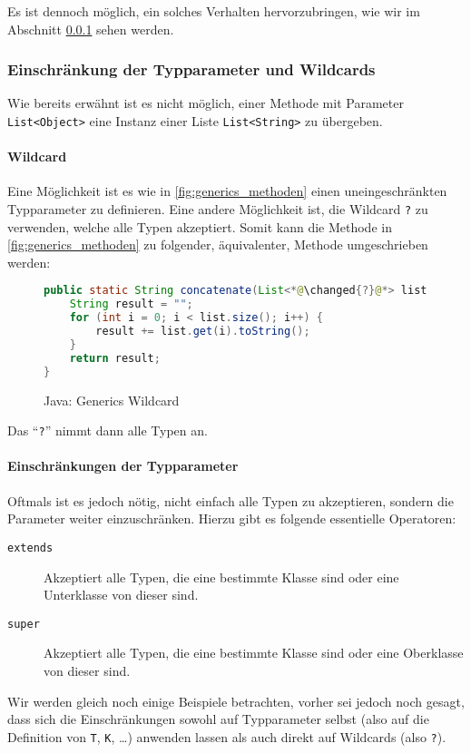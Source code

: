 		Es ist dennoch möglich, ein solches Verhalten hervorzubringen, wie wir im Abschnitt \ref{sec:generics_restriction} sehen werden.
	
	\subsubsection{Einschränkung der Typparameter und Wildcards}
		\label{sec:generics_restriction}
	
		Wie bereits erwähnt ist es nicht möglich, einer Methode mit Parameter \texttt{List<Object>} eine Instanz einer Liste \texttt{List<String>} zu übergeben.
		
		\paragraph{Wildcard}
			Eine Möglichkeit ist es wie in \ref{fig:generics_methoden} einen uneingeschränkten Typparameter zu definieren. Eine andere Möglichkeit ist, die Wildcard \texttt{?} zu verwenden, welche alle Typen akzeptiert. Somit kann die Methode in \ref{fig:generics_methoden} zu folgender, äquivalenter, Methode umgeschrieben werden:
			\begin{figure}[H]
				\centering
				\begin{lstlisting}[language = Java]
public static String concatenate(List<*@\changed{?}@*> list) {
	String result = "";
	for (int i = 0; i < list.size(); i++) {
		result += list.get(i).toString();
	}
	return result;
}
				\end{lstlisting}
				\caption{Java: Generics Wildcard}
			\end{figure}
			Das \enquote{\texttt{?}} nimmt dann alle Typen an.
		
		\paragraph{Einschränkungen der Typparameter}
			Oftmals ist es jedoch nötig, nicht einfach alle Typen zu akzeptieren, sondern die Parameter weiter einzuschränken. Hierzu gibt es folgende essentielle Operatoren:
			\begin{description}
				\item[\texttt{extends}] Akzeptiert alle Typen, die eine bestimmte Klasse sind oder eine Unterklasse von dieser sind.
				\item[\texttt{super}] Akzeptiert alle Typen, die eine bestimmte Klasse sind oder eine Oberklasse von dieser sind.
			\end{description}
			Wir werden gleich noch einige Beispiele betrachten, vorher sei jedoch noch gesagt, dass sich die Einschränkungen sowohl auf Typparameter selbst (also auf die Definition von \texttt{T}, \texttt{K}, \dots) anwenden lassen als auch direkt auf Wildcards (also \texttt{?}).
			
